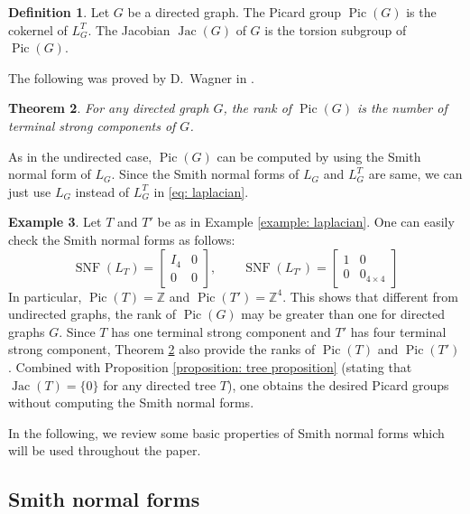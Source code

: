 \documentclass[11pt,reqno]{amsart}
\DeclareMathOperator{\Pic}{Pic}
\DeclareMathOperator{\Jac}{Jac}
\DeclareMathOperator{\snf}{SNF}
\theoremstyle{definition}
\newtheorem{mydef}{Definition}[section]
\newtheorem{myeg}[mydef]{Example}
\theoremstyle{plain}
\newtheorem{mytheorem}[mydef]{Theorem}
\begin{document}
\begin{mydef}
Let $G$ be a directed graph. The Picard group $\Pic(G)$ is the cokernel of $L_G^T$. The Jacobian $\Jac(G)$ of $G$ is the torsion subgroup of $\Pic(G)$. 
\end{mydef}

The following was proved by D.~Wagner in \cite{wagner2000critical}. 

\begin{mytheorem}\cite[Corollary 3.5]{wagner2000critical} \label{theorem: wagner}
For any directed graph $G$, the rank of $\Pic(G)$ is the number of terminal strong components of $G$. 	
\end{mytheorem}


As in the undirected case, $\Pic(G)$ can be computed by using the Smith normal form of $L_G$. Since the Smith normal forms of $L_G$ and $L_G^T$ are same, we can just use $L_G$ instead of $L_G^T$ in \eqref{eq: laplacian}. 

\begin{myeg}
Let $T$ and $T'$ be as in Example \ref{example: laplacian}. One can easily check the Smith normal forms as follows:
\[
\snf(L_T)=\left[\begin{array}{c|c}
	I_4 & 0 \\ \hline
	0 & 0
\end{array}\right], \qquad \snf(L_{T'})=\left[\begin{array}{c|c}
1 & 0 \\ \hline
0 & 0_{4\times 4}
\end{array}\right]
\]
In particular, $\Pic(T)=\mathbb{Z}$ and $\Pic(T')=\mathbb{Z}^4$. This shows that different from undirected graphs, the rank of $\Pic(G)$ may be greater than one for directed graphs $G$. Since $T$ has one terminal strong component and $T'$ has four terminal strong component, Theorem \ref{theorem: wagner} also provide the ranks of $\Pic(T)$ and $\Pic(T')$. Combined with Proposition \ref{proposition: tree proposition} (stating that $\Jac(T)=\{0\}$ for any directed tree $T$), one obtains the desired Picard groups without computing the Smith normal forms. 
\end{myeg}

In the following, we review some basic properties of Smith normal forms which will be used throughout the paper.  


\subsection{Smith normal forms}
\end{document}
